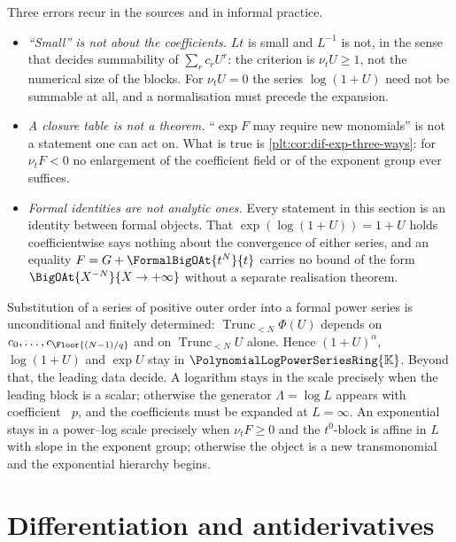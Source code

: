 \documentclass[11pt,oneside]{article}
\theoremstyle{plain}
\theoremstyle{definition}
\theoremstyle{remark}
\newcommand{\K}{\mathbb{K}}
\newcommand{\PLpow}{\PolynomialLogPowerSeriesRing{\K}}   %
\newcommand{\ordt}{\nu_{t}}                              %
\DeclareMathOperator{\degL}{deg_{L}}
\newcommand{\Trunc}[2]{\operatorname{Trunc}_{<#2}#1}     %
\begin{document}
\begin{warningbox}
Three errors recur in the sources and in informal practice.
\begin{itemize}
\item \emph{``Small'' is not about the coefficients.}  \(Lt\) is small and
  \(L^{-1}\) is not, in the sense that decides summability of
  \(\sum_{r}c_{r}U^{r}\): the criterion is \(\ordt U\ge1\), not the numerical
  size of the blocks.  For \(\ordt U=0\) the series
  \(\log(1+U)\) need not be summable at all, and a normalisation must precede
  the expansion.
\item \emph{A closure table is not a theorem.}  ``\(\exp F\) may require new
  monomials'' is not a statement one can act on.  What is true is
  \cref{plt:cor:dif-exp-three-ways}: for \(\ordt F<0\) no enlargement of the
  coefficient field or of the exponent group ever suffices.
\item \emph{Formal identities are not analytic ones.}  Every statement in this
  section is an identity between formal objects.  That
  \(\exp(\log(1+U))=1+U\) holds coefficientwise says nothing about the
  convergence of either series, and an equality
  \(F=G+\FormalBigOAt{t^{N}}{t}\) carries no bound of the form
  \(\BigOAt{X^{-N}}{X\to+\infty}\) without a separate realisation theorem.
\end{itemize}
\end{warningbox}

\begin{summarybox}
Substitution of a series of positive outer order into a formal power series is
unconditional and finitely determined: \(\Trunc{\Phi(U)}{N}\) depends on
\(c_{0},\dots,c_{\Floor{(N-1)/q}}\) and on \(\Trunc{U}{N}\) alone.  Hence
\((1+U)^{\alpha}\), \(\log(1+U)\) and \(\exp U\) stay in \(\PLpow\).  Beyond
that, the leading data decide.  A logarithm stays in the scale precisely when
the leading block is a scalar; otherwise the generator \(\Lambda=\log L\)
appears with coefficient \(\degL p\), and the coefficients must be expanded at
\(L=\infty\).  An exponential stays in a power--log scale precisely when
\(\ordt F\ge0\) and the \(t^{0}\)-block is affine in \(L\) with slope in the
exponent group; otherwise the object is a new transmonomial and the
exponential hierarchy begins.
\end{summarybox}

\section{Differentiation and antiderivatives}
\label{plt:sec:differential}
\end{document}
